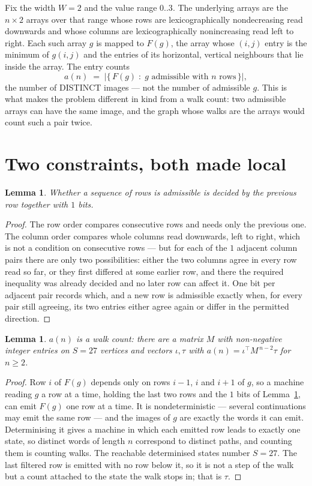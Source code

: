 \documentclass[11pt,a4paper]{article}
\theoremstyle{plain}
\newtheorem{lemma}[theorem]{Lemma}
\theoremstyle{definition}
\begin{document}
Fix the width $W=2$ and the value range $0..3$. The underlying arrays are the
$n\times2$ arrays over that range whose rows are lexicographically nondecreasing read downwards
and whose columns are lexicographically nonincreasing read left to right. Each such array $g$
is mapped to $F(g)$, the array whose $(i,j)$ entry is the minimum of $g(i,j)$ and the entries
of its horizontal, vertical neighbours that lie inside the array. The entry counts
\[
a(n)\;=\;\bigl|\{\,F(g)\;:\;g\text{ admissible with }n\text{ rows}\,\}\bigr|,
\]
the number of DISTINCT images --- not the number of admissible $g$. This is what makes the
problem different in kind from a walk count: two admissible arrays can have the same image, and
the graph whose walks are the arrays would count such a pair twice.

\section{Two constraints, both made local}

\begin{lemma}\label{lem:local}
Whether a sequence of rows is admissible is decided by the previous row together with
$1$ bits.
\end{lemma}

\begin{proof}
The row order compares consecutive rows and needs only the previous one. The column order
compares whole columns read downwards, left to right, which is not a condition on consecutive
rows --- but for each of the $1$ adjacent column pairs there are only two possibilities:
either the two columns agree in every row read so far, or they first differed at some earlier
row, and there the required inequality was already decided and no later row can affect it. One
bit per adjacent pair records which, and a new row is admissible exactly when, for every pair
still agreeing, its two entries either agree again or differ in the permitted direction.
\end{proof}

\begin{lemma}\label{lem:det}
$a(n)$ is a walk count: there are a matrix $M$ with non-negative integer entries on $S=27$
vertices and vectors $\iota,\tau$ with $a(n)=\iota^{\!\top}M^{\,n-2}\tau$ for $n\ge2$.
\end{lemma}

\begin{proof}
Row $i$ of $F(g)$ depends only on rows $i-1$, $i$ and $i+1$ of $g$, so a machine reading $g$ a
row at a time, holding the last two rows and the $1$ bits of Lemma~\ref{lem:local}, can
emit $F(g)$ one row at a time. It is nondeterministic --- several continuations may emit the
same row --- and the images of $g$ are exactly the words it can emit. Determinising it gives a
machine in which each emitted row leads to exactly one state, so distinct words of length $n$
correspond to distinct paths, and counting them is counting walks. The reachable determinised
states number $S=27$. The last filtered row is emitted with no row below it, so it is not a
step of the walk but a count attached to the state the walk stops in; that is $\tau$.
\end{proof}
\end{document}
